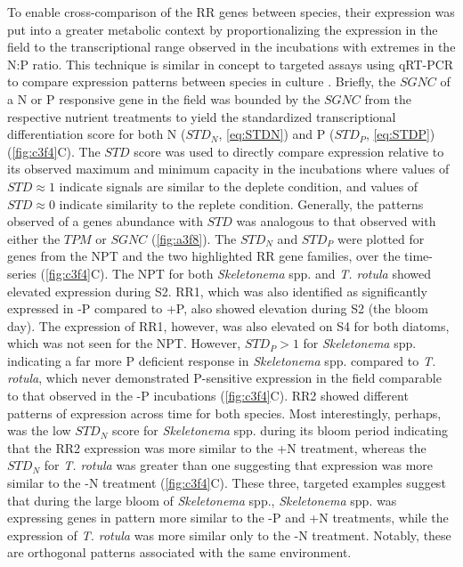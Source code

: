 To enable cross-comparison of the RR genes between species, their expression was put into a greater metabolic context by proportionalizing the expression in the field to the transcriptional range observed in the incubations with extremes in the N:P ratio. This technique is similar in concept to targeted assays using qRT-PCR to compare expression patterns between species in culture \citep{Kang2009}. Briefly, the $SGNC$ of a N or P responsive gene in the field was bounded by the $SGNC$ from the respective nutrient treatments to yield the standardized transcriptional differentiation score for both N ($STD_N$, \cref{eq:STDN}) and P ($STD_P$, \cref{eq:STDP}) (\cref{fig:c3f4}C). The $STD$ score was used to directly compare expression relative to its observed maximum and minimum capacity in the incubations where values of $STD \approx 1$ indicate signals are similar to the deplete condition, and values of $STD \approx 0$ indicate similarity to the replete condition. Generally, the patterns observed of a genes abundance with $STD$ was analogous to that observed with either the $TPM$ or $SGNC$ (\cref{fig:a3f8}).  The $STD_N$ and $STD_P$ were plotted for genes from the NPT and the two highlighted RR gene families, over the time-series (\cref{fig:c3f4}C). The NPT for both \textit{Skeletonema} spp. and \textit{T. rotula} showed elevated expression during S2. RR1, which was also identified as significantly expressed in -P compared to +P, also showed elevation during S2 (the bloom day). The expression of RR1, however, was also elevated on S4 for both diatoms, which was not seen for the NPT. However, $STD_P >1$ for \textit{Skeletonema} spp. indicating a far more P deficient response in \textit{Skeletonema} spp. compared to \textit{T. rotula}, which never demonstrated P-sensitive expression in the field comparable to that observed in the -P incubations (\cref{fig:c3f4}C). RR2 showed different patterns of expression across time for both species. Most interestingly, perhaps, was the low $STD_N$ score for \textit{Skeletonema} spp. during its bloom period indicating that the RR2 expression was more similar to the +N treatment, whereas the $STD_N$ for \textit{T. rotula} was greater than one suggesting that expression was more similar to the -N treatment (\cref{fig:c3f4}C). These three, targeted examples suggest that during the large bloom of \textit{Skeletonema} spp., \textit{Skeletonema} spp. was expressing genes in pattern more similar to the -P and +N treatments, while the expression of \textit{T. rotula} was more similar only to the -N treatment. Notably, these are orthogonal patterns associated with the same environment. \par
